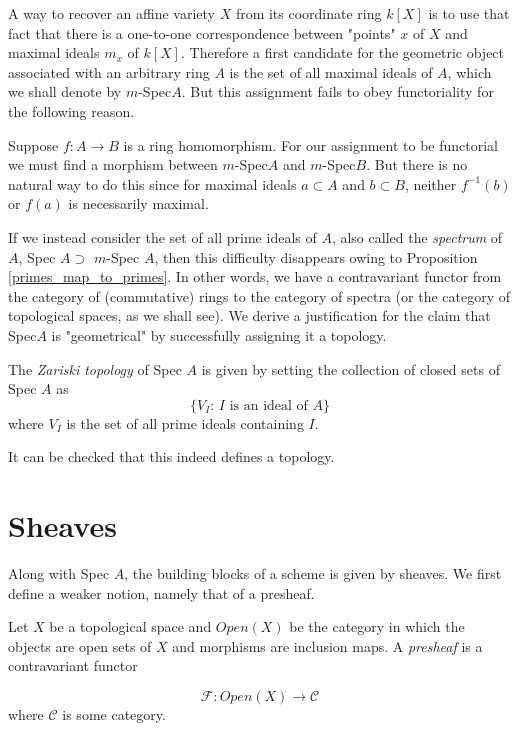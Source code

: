 \documentclass[ag.tex]{subfiles}
\begin{document}
A way to recover an affine variety $X$ from its coordinate ring $k[X]$ is to use that fact that there is a one-to-one correspondence between "points" $x$ of $X$ and maximal ideals $m_x$ of $k[X]$.  Therefore a first candidate for the geometric object associated with an arbitrary ring $A$ is the set of all maximal ideals of $A$, which we shall denote by $m$-Spec$A$.  But this assignment fails to obey functoriality for the following reason.

Suppose $f: A \to B$ is a ring homomorphism.  For our assignment to be functorial we must find a morphism between $m$-Spec$A$ and $m$-Spec$B$. But there is no natural way to do this since for maximal ideals $a \subset A$ and $b \subset B$, neither $f^{-1} (b)$ or $f(a)$ is necessarily maximal. 

If we instead consider the set of all prime ideals of $A$, also called the \textit{spectrum} of $A$, Spec $A \supset$ $m$-Spec $A$, then this difficulty disappears owing to Proposition \ref{primes_map_to_primes}.  In other words, we have a contravariant functor from the category of (commutative) rings to the category of spectra (or the category of topological spaces,  as we shall see).  We derive a justification for the claim that Spec$A$ is "geometrical" by successfully assigning it a topology.

\begin{definition} 
The \textit{Zariski topology} of Spec $A$ is given by setting the collection of closed sets of Spec $A$ as
\begin{equation*}
\text{\{$V_I$: $I$ is an ideal of $A$\}}
\end{equation*}
where $V_I$ is the set of all prime ideals containing $I$.
\end{definition} 

It can be checked that this indeed defines a topology.

\section{Sheaves}

Along with Spec $A$,  the building blocks of a scheme is given by sheaves.  We first define a weaker notion, namely that of a presheaf.

\begin{definition}
Let $X$ be a topological space and $Open(X)$ be the category in which the objects are open sets of $X$ and morphisms are inclusion maps. A \textit{presheaf} is a contravariant functor

\begin{equation*}
\mathcal{F}: Open(X) \to \mathcal{C}
\end{equation*}
where $\mathcal{C}$ is some category.
\end{definition}
\end{document}

